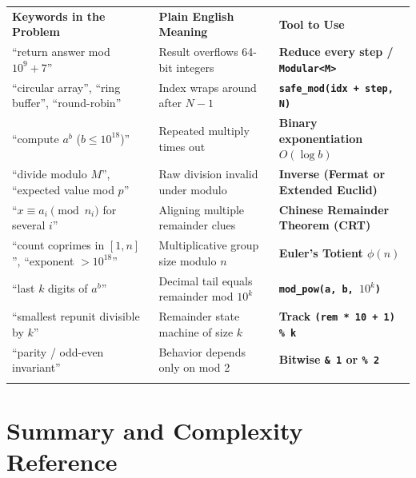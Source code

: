 \documentclass[11pt,a4paper]{article}
\theoremstyle{definition}
\begin{document}
\begingroup\small{}
\begin{tabularx}{\textwidth}{>{\raggedright\arraybackslash}p{4.4cm} >{\raggedright\arraybackslash}X >{\raggedright\arraybackslash\bfseries}p{4.1cm}}
\arrayrulecolor{primaryblue}\toprule[1.2pt]
\rowcolor{primaryblue!10}
\textcolor{primaryblue}{\textbf{Keywords in the Problem}} & \textcolor{primaryblue}{\textbf{Plain English Meaning}} & \textcolor{primaryblue}{\textbf{Tool to Use}} \\
\arrayrulecolor{codeframe}\midrule[0.6pt]
``return answer mod $10^9 + 7$'' & Result overflows 64-bit integers & Reduce every step / \texttt{Modular<M>} \\
``circular array'', ``ring buffer'', ``round-robin'' & Index wraps around after $N - 1$ & \texttt{safe\_mod(idx + step, N)} \\
``compute $a^b$ ($b \le 10^{18}$)'' & Repeated multiply times out & Binary exponentiation $O(\log b)$ \\
``divide modulo $M$'', ``expected value mod $p$'' & Raw division invalid under modulo & Inverse (Fermat or Extended Euclid) \\
``$x \equiv a_i \pmod{n_i}$ for several $i$'' & Aligning multiple remainder clues & Chinese Remainder Theorem (CRT) \\
``count coprimes in $[1, n]$'', ``exponent $> 10^{18}$'' & Multiplicative group size modulo $n$ & Euler's Totient $\phi(n)$ \\
``last $k$ digits of $a^b$'' & Decimal tail equals remainder mod $10^k$ & \texttt{mod\_pow(a, b, $10^k$)} \\
``smallest repunit divisible by $k$'' & Remainder state machine of size $k$ & Track \texttt{(rem * 10 + 1) \% k} \\
``parity / odd-even invariant'' & Behavior depends only on mod 2 & Bitwise \texttt{\& 1} or \texttt{\% 2} \\
\arrayrulecolor{primaryblue}\bottomrule[1.2pt]
\end{tabularx}\endgroup

\section{Summary and Complexity Reference}
\end{document}
